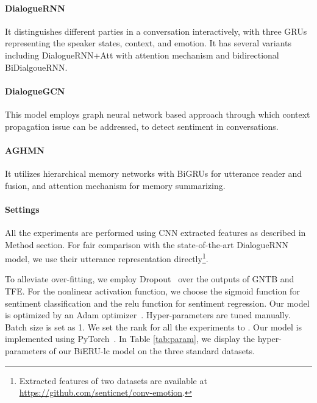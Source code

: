 \documentclass[journal]{IEEEtran}
\begin{document}
\paragraph{DialogueRNN~\cite{majumder2019dialoguernn}}
It distinguishes different parties in a conversation interactively, with three GRUs representing the speaker states, context, and emotion.
It has several variants including DialogueRNN+Att with attention mechanism and bidirectional BiDialgoueRNN.


\paragraph{DialogueGCN~\cite{ghosal2019dialoguegcn}}
This model employs graph neural network based approach through which context propagation issue can be addressed, to detect sentiment in conversations.
\paragraph{AGHMN~\cite{jiao2019real}}
It utilizes hierarchical memory networks with BiGRUs for utterance reader and fusion, and attention mechanism for memory summarizing.

\paragraph{Settings}
All the experiments are performed using CNN extracted features as described in Method section. For fair comparison with the state-of-the-art DialogueRNN model, we use their utterance representation directly\footnote{Extracted features of two datasets are available at \url{https://github.com/senticnet/conv-emotion}.}.

To alleviate over-fitting, we employ
Dropout~\cite{srivastava2014dropout} over the outputs of GNTB and TFE. For the nonlinear activation function, we choose the sigmoid function for sentiment classification and the relu function for sentiment regression. Our model is optimized by an Adam optimizer~\cite{kingma2014adam}. Hyper-parameters are tuned manually. Batch size is set as 1. We set the rank for all the experiments to . Our model is implemented using PyTorch~\cite{paszke2019pytorch}. In Table \ref{tab:param}, we display the hyper-parameters of our BiERU-lc model on the three standard datasets.
\end{document}
